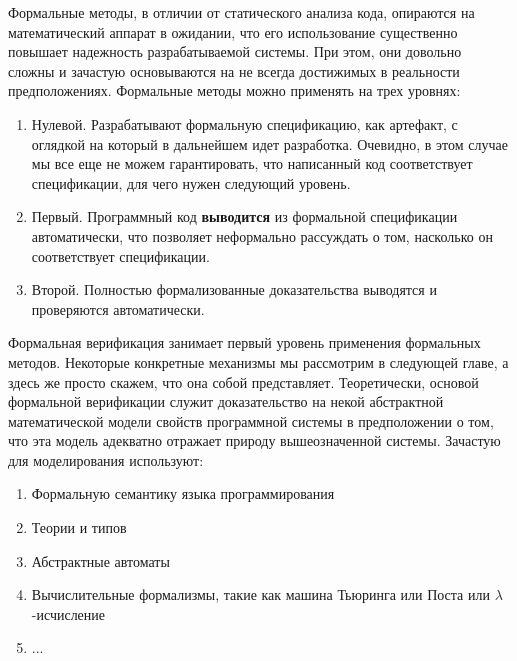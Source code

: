 Формальные методы, в отличии от статического анализа кода, опираются на математический аппарат в ожидании, что его использование существенно повышает надежность разрабатываемой системы. При этом, они довольно сложны и зачастую основываются на не всегда достижимых в реальности предположениях. Формальные методы можно применять на трех уровнях:

\begin{enumerate}
  \item Нулевой. Разрабатывают формальную спецификацию, как артефакт, с оглядкой на который в дальнейшем идет разработка. Очевидно, в этом случае мы все еще не можем гарантировать, что написанный код соответствует спецификации, для чего нужен следующий уровень.
  \item Первый. Программный код \textbf{выводится} из формальной спецификации автоматически, что позволяет неформально рассуждать о том, насколько он соответствует спецификации.
  \item Второй. Полностью формализованные доказательства выводятся и проверяются автоматически.
\end{enumerate}

Формальная верификация занимает первый уровень применения формальных методов. Некоторые конкретные механизмы мы рассмотрим в следующей главе, а здесь же просто скажем, что она собой представляет. Теоретически, основой формальной верификации служит доказательство на некой абстрактной математической модели свойств программной системы в предположении о том, что эта модель адекватно отражает природу вышеозначенной системы. Зачастую для моделирования используют:

\begin{enumerate}
  \item Формальную семантику языка программирования
  \item Теории и типов
  \item Абстрактные автоматы
  \item Вычислительные формализмы, такие как машина Тьюринга или Поста или $\lambda$-исчисление
  \item ...
\end{enumerate}
